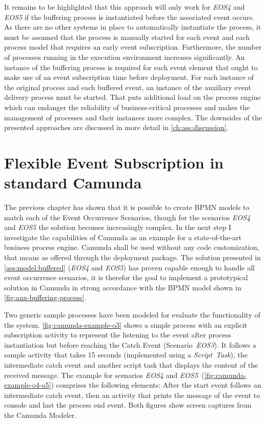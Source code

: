 It remains to be highlighted that this approach will only work for \textit{EOS4} and \textit{EOS5} if the buffering process is instantiated before the associated event occurs. As there are no other systems in place to automatically instantiate the process, it must be assumed that the process is manually started for each event and each process model that requires an early event subscription.
Furthermore, the number of processes running in the execution environment increases significantly. An instance of the buffering process is required for each event element that ought to make use of an event subscription time before deployment. For each instance of the original process and each buffered event, an instance of the auxiliary event delivery process must be started.
That puts additional load on the process engine which can endanger the reliability of business-critical processes and makes the management of processes and their instances more complex.
The downsides of the presented approaches are discussed in more detail in \autoref{ch:ass:discussion}.



\section{Flexible Event Subscription in standard Camunda}\label{ch:assessment-implementation}
The previous chapter has shown that it is possible to create BPMN models to match each of the Event Occurrence Scenarios, though for the scenarios \textit{EOS4} and \textit{EOS5} the solution becomes increasingly complex.
In the next step I investigate the capabilities of Camunda as an example for a state-of-the-art business process engine.
Camunda shall be used without any code customization, that means as offered through the deployment package.
The solution presented in \autoref{ass:model:buffered} (\textit{EOS4} and \textit{EOS5}) has proven capable enough to handle all event occurrence scenarios, it is therefor the goal to implement a prototypical solution in Camunda in strong accordance with the BPMN model shown in \autoref{fig:aux-buffering-process}.

Two generic sample processes have been modeled for evaluate the functionality of the system. \autoref{fig:camunda-example-o3} shows a simple process with an explicit subscription activity to represent the listening to the event after process instantiation but before reaching the Catch Event (Scenario~\textit{EOS3}). It follows a sample activity that takes 15 seconds (implemented using a \textit{Script~Task}), the intermediate catch event and another script task that displays the content of the received message.
The example for scenarios \textit{EOS4} and \textit{EOS5}~(\autoref{fig:camunda-example-o4-o5}) comprises the following elements: After the start event follows an intermediate catch event, then an activity that prints the message of the event to console and last the process end event. Both figures show screen captures from the Camunda Modeler.


